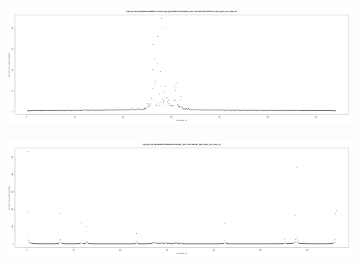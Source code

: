 \begin{figure}[!htb]
	\centering
	\begin{subfigure}[t]{0.4\textwidth}
		\centering
		\caption{}
		\includegraphics[width=\linewidth]{fig/tension/tension_bed.png}
		\label{fig:tension_bed}
	\end{subfigure}
	\begin{subfigure}[t]{0.4\textwidth}
		\centering
		\caption{}
		\includegraphics[width=\linewidth]{fig/tension/tension_bed_relaxed.png}
		\label{fig:tension_extracted}
	\end{subfigure}
\\
	\begin{subfigure}[t]{0.1\textwidth}
		\centering
		\caption{}

\end{subfigure}
\end{figure}
